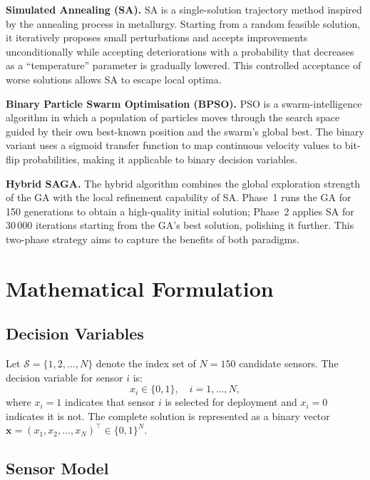 \documentclass[12pt,a4paper]{article}
\begin{document}
\textbf{Simulated Annealing (SA).}
SA is a single-solution trajectory method inspired by the annealing process in metallurgy.
Starting from a random feasible solution, it iteratively proposes small perturbations and accepts improvements unconditionally while accepting deteriorations with a probability that decreases as a ``temperature'' parameter is gradually lowered.
This controlled acceptance of worse solutions allows SA to escape local optima.

\textbf{Binary Particle Swarm Optimisation (BPSO).}
PSO is a swarm-intelligence algorithm in which a population of particles moves through the search space guided by their own best-known position and the swarm's global best.
The binary variant uses a sigmoid transfer function to map continuous velocity values to bit-flip probabilities, making it applicable to binary decision variables.

\textbf{Hybrid SAGA.}
The hybrid algorithm combines the global exploration strength of the GA with the local refinement capability of SA.
Phase~1 runs the GA for 150 generations to obtain a high-quality initial solution; Phase~2 applies SA for 30\,000 iterations starting from the GA's best solution, polishing it further.
This two-phase strategy aims to capture the benefits of both paradigms.

\section{Mathematical Formulation}

\subsection{Decision Variables}

Let $\mathcal{S} = \{1, 2, \ldots, N\}$ denote the index set of $N = 150$ candidate sensors.
The decision variable for sensor $i$ is:
\begin{equation}
  x_i \in \{0, 1\}, \quad i = 1, \ldots, N,
\end{equation}
where $x_i = 1$ indicates that sensor $i$ is selected for deployment and $x_i = 0$ indicates it is not.
The complete solution is represented as a binary vector $\mathbf{x} = (x_1, x_2, \ldots, x_N)^{\top} \in \{0,1\}^N$.

\subsection{Sensor Model}
\end{document}
